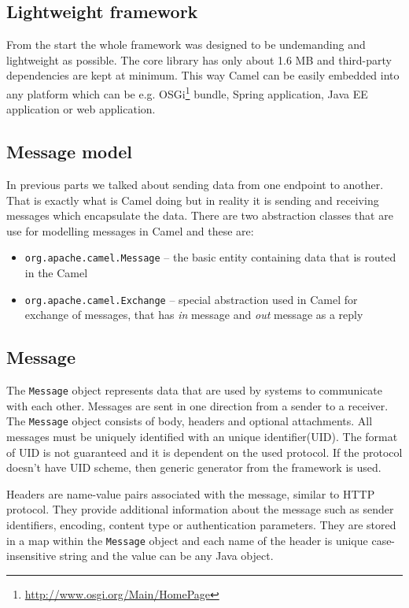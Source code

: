 \documentclass[12pt,final,oneside]{fithesis2}
\begin{document}
\subsection*{Lightweight framework}
From the start the whole framework was designed to be undemanding and lightweight as possible. The core library has only about 1.6 MB and third-party dependencies are kept at minimum. This way Camel can be easily embedded into any platform which can be e.g. OSGi\footnote{\url{http://www.osgi.org/Main/HomePage}} bundle, Spring application, Java EE application or web application. 

\subsection{Message model}
In previous parts we talked about sending data from one endpoint to another. That is exactly what is Camel doing but in reality it is sending and receiving messages which encapsulate the data. There are two abstraction classes that are use for modelling messages in Camel and these are:
\begin{itemize}
\item
\texttt{org.apache.camel.Message} -- the basic entity containing data that is routed in the Camel 

\item
\texttt{org.apache.camel.Exchange} -- special abstraction used in Camel for exchange of messages, that has \textit{in} message and \textit{out} message as a reply

\end{itemize} 

\subsection*{Message}
The \texttt{Message} object represents data that are used by systems to communicate with each other. Messages are sent in one direction from a sender to a receiver. The \texttt{Message} object consists of body, headers and optional attachments. All messages must be uniquely identified with an unique identifier(UID). The format of UID is not guaranteed and it is dependent on the used protocol. If the protocol doesn't have UID scheme, then generic generator from the framework is used.

Headers are name-value pairs associated with the message, similar to HTTP protocol. They provide additional information about the message such as sender identifiers, encoding, content type or authentication parameters. They are stored in a map within the \texttt{Message} object and each name of the header is unique case-insensitive string and the value can be any Java object.
\end{document}
